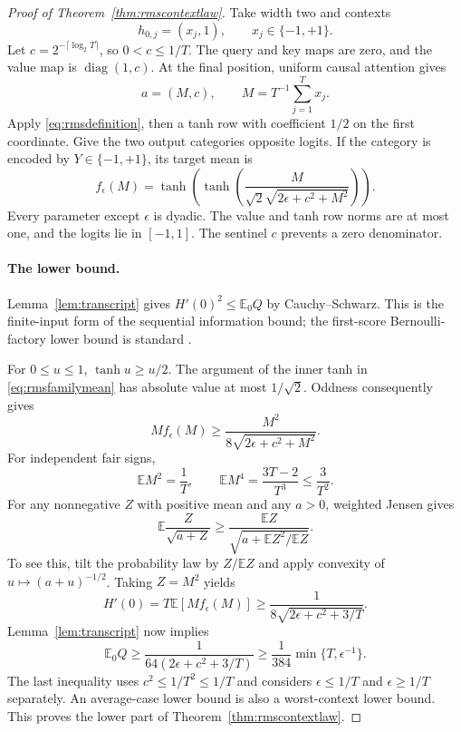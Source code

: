 \begin{proof}[Proof of Theorem~\ref{thm:rmscontextlaw}]
Take width two and contexts
\[
 h_{0,j}=(x_j,1),\qquad x_j\in\{-1,+1\}.
\]
Let $c=2^{-\lceil\log_2T\rceil}$, so $0<c\le1/T$. The
query and key maps are zero, and the value map is
$\operatorname{diag}(1,c)$. At the final position, uniform
causal attention gives
\[
 a=(M,c),\qquad M=T^{-1}\sum_{j=1}^T x_j.
\]
Apply \eqref{eq:rmsdefinition}, then a tanh row with coefficient
$1/2$ on the first coordinate. Give the two output categories
opposite logits. If the category is encoded by $Y\in\{-1,+1\}$,
its target mean is
\begin{equation}
 f_\epsilon(M)
 =\tanh\!\left(\tanh\!\left(
   \frac{M}{\sqrt2\sqrt{2\epsilon+c^2+M^2}}
 \right)\right).
 \label{eq:rmsfamilymean}
\end{equation}
Every parameter except $\epsilon$ is dyadic. The value and
tanh row norms are at most one, and the logits lie in $[-1,1]$.
The sentinel $c$ prevents a zero denominator.

\paragraph{The lower bound.}
Lemma~\ref{lem:transcript} gives $H'(0)^2\le\mathbb E_0Q$ by
Cauchy--Schwarz. This is the finite-input form of the sequential
information bound; the first-score Bernoulli-factory lower bound
is standard \cite{mendo2019}.

For $0\le u\le1$, $\tanh u\ge u/2$. The argument of the
inner tanh in \eqref{eq:rmsfamilymean} has absolute value
at most $1/\sqrt2$. Oddness consequently gives
\[
 M f_\epsilon(M)
 \ge\frac{M^2}{8\sqrt{2\epsilon+c^2+M^2}}.
\]
For independent fair signs,
\[
 \mathbb E M^2=\frac1T,
 \qquad \mathbb E M^4=\frac{3T-2}{T^3}\le\frac3{T^2}.
\]
For any nonnegative $Z$ with positive mean and any $a>0$,
weighted Jensen gives
\begin{equation}
 \mathbb E\frac{Z}{\sqrt{a+Z}}
 \ge\frac{\mathbb E Z}
 {\sqrt{a+\mathbb E Z^2/\mathbb E Z}}.
 \label{eq:rmsweightedjensen}
\end{equation}
To see this, tilt the probability law by $Z/\mathbb E Z$
and apply convexity of $u\mapsto(a+u)^{-1/2}$.
Taking $Z=M^2$ yields
\[
 H'(0)=T\mathbb E[Mf_\epsilon(M)]
 \ge\frac1{8\sqrt{2\epsilon+c^2+3/T}}.
\]
Lemma~\ref{lem:transcript} now implies
\begin{equation}
 \mathbb E_0Q
 \ge\frac1{64(2\epsilon+c^2+3/T)}
 \ge\frac1{384}\min\{T,\epsilon^{-1}\}.
 \label{eq:rmsscorelower}
\end{equation}
The last inequality uses $c^2\le1/T^2\le1/T$ and considers
$\epsilon\le1/T$ and $\epsilon\ge1/T$ separately.
An average-case lower bound is also a worst-context lower
bound. This proves the lower part of
Theorem~\ref{thm:rmscontextlaw}.


\end{proof}
